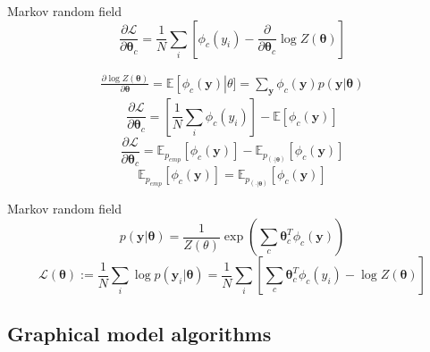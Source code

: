 \documentclass{beamer}
\begin{document}
\begin{frame}{Markov random field}
\begin{equation}
\frac{\partial\mathcal{L}}{\partial\boldsymbol{\theta}_{c}}=\frac{1}{N}\sum_{i}\left[\phi_{c}(y_{i})-\frac{\partial}{\partial\boldsymbol{\theta}_{c}}\log Z(\boldsymbol{\theta})\right]
\end{equation}

\begin{equation}
\begin{split}
\frac{\partial \log Z(\boldsymbol{\theta})}{\partial\boldsymbol{\theta}}=\mathbb{E}\left[\phi_{c}(\textbf{y})\right|\theta]= \sum_{\textbf{y}}\phi_{c}(\textbf{y})p(\textbf{y}|\boldsymbol{\theta})
\end{split}
\end{equation}
\begin{equation}
\frac{\partial\mathcal{L}}{\partial\boldsymbol{\theta}_{c}}=\left[\frac{1}{N}\sum_{i}\phi_{c}(y_{i})\right]-\mathbb{E}\left[\phi_{c}(\textbf{y})\right]
\end{equation}
\begin{equation}
\frac{\partial\mathcal{L}}{\partial\boldsymbol{\theta}_{c}}=\mathbb{E}_{p_{emp}}\left[\phi_{c}(\textbf{y})\right]-\mathbb{E}_{p_{(\cdot|\boldsymbol{\theta})}}\left[\phi_{c}(\textbf{y})\right]
\end{equation}
\begin{equation}
\mathbb{E}_{p_{emp}}\left[\phi_{c}(\textbf{y})\right]=\mathbb{E}_{p_{(\cdot|\boldsymbol{\theta})}}\left[\phi_{c}(\textbf{y})\right]
\end{equation}
\end{frame}

\begin{frame}{Markov random field}
\begin{equation}
p\left(\textbf{y}|\boldsymbol{\theta}\right) = \dfrac{1}{Z(\theta)}\exp \left( \sum_{c}\boldsymbol{\theta}^{T}_{c}\phi_{c}\left(\textbf{y}\right)\right)
\end{equation}
\begin{equation}
\mathcal{L}\left(\boldsymbol{\theta}\right):= \frac{1}{N}\sum_{i}\log p\left(\textbf{y}_{i}|\boldsymbol{\theta}\right)=\frac{1}{N}\sum_{i}\left[\sum_{c} \boldsymbol{\theta}^{T}_{c}\phi_{c}(y_{i})-\log Z\left(\boldsymbol{\theta}\right)\right]
\end{equation}
\end{frame}


\subsection{Graphical model algorithms}
\end{document}
